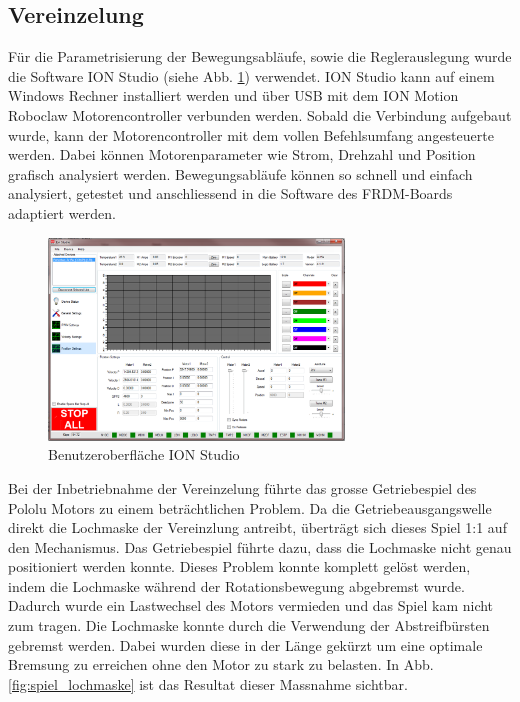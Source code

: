 \subsection{Vereinzelung} \label{sec:Inbetriebnahme_Vereinzelung}
Für die Parametrisierung der Bewegungsabläufe, sowie die Reglerauslegung wurde die Software ION Studio (siehe Abb. \ref{fig:ION_Studio}) verwendet. ION Studio kann auf einem Windows Rechner installiert werden und über USB mit dem ION Motion Roboclaw Motorencontroller verbunden werden. Sobald die Verbindung aufgebaut wurde, kann der Motorencontroller mit dem vollen Befehlsumfang angesteuerte werden. Dabei können Motorenparameter wie Strom, Drehzahl und Position grafisch analysiert werden. Bewegungsabläufe können so schnell und einfach analysiert, getestet und anschliessend in die Software des FRDM-Boards adaptiert werden.

\begin{figure}[H]
	\includegraphics[draft=false,width=0.7\textwidth]{Illustrationen/7-Inbetriebnahme_und_Kalibration/ION_Studio.png}
	\caption{Benutzeroberfläche ION Studio}
	\label{fig:ION_Studio}
\end{figure}

Bei der Inbetriebnahme der Vereinzelung führte das grosse Getriebespiel des Pololu Motors zu einem beträchtlichen Problem. Da die Getriebeausgangswelle direkt die Lochmaske der Vereinzlung antreibt, überträgt sich dieses Spiel 1:1 auf den Mechanismus. Das Getriebespiel führte dazu, dass die Lochmaske nicht genau positioniert werden konnte. Dieses Problem konnte komplett gelöst werden, indem die Lochmaske während der Rotationsbewegung abgebremst wurde. Dadurch wurde ein Lastwechsel des Motors vermieden und das Spiel kam nicht zum tragen. Die Lochmaske konnte durch die Verwendung der Abstreifbürsten gebremst werden. Dabei wurden diese in der Länge gekürzt um eine optimale Bremsung zu erreichen ohne den Motor zu stark zu belasten. In Abb. \ref{fig:spiel_lochmaske} ist das Resultat dieser Massnahme sichtbar.

